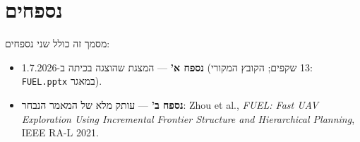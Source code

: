 \documentclass[11pt,a4paper]{article}
\begin{document}

\clearpage
{}
{}
\part*{נספחים}

\noindent מסמך זה כולל שני נספחים:
\begin{itemize}
    \item \textbf{נספח א'} — המצגת שהוצגה בכיתה ב-1.7.2026 (13 שקפים; הקובץ המקורי: \texttt{\textenglish{FUEL.pptx}} במאגר).
    \item \textbf{נספח ב'} — עותק מלא של המאמר הנבחר: \textenglish{Zhou et al., \textit{FUEL: Fast UAV Exploration Using Incremental Frontier Structure and Hierarchical Planning}, IEEE RA-L 2021}.
\end{itemize}

\clearpage
{}
{}


\clearpage
{}
{}

\end{document}
